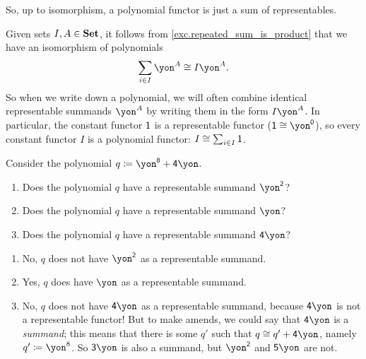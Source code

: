 \documentclass[Book-Poly]{subfiles}
\begin{document}
So, up to isomorphism, a polynomial functor is just a sum of representables.

\begin{remark}
    Given sets $I, A \in \mathbf{Set}$, it follows from \cref{exc.repeated_sum_is_product} that we have an isomorphism of polynomials
    \[
    \sum_{i \in I} \yon^A \iso I\yon^A.
    \]
    So when we write down a polynomial, we will often combine identical representable summands $\yon^A$ by writing them in the form $I\yon^A$.
    In particular, the constant functor $\textsf{1}$ is a representable functor ($\1 \iso \yon^\0$), so every constant functor $I$ is a polynomial functor: $I \cong \sum_{i \in I} \textsf{1}$.
\end{remark}

\begin{exercise}
    Consider the polynomial $q\coloneqq\yon^\8+\4\yon$.
    \begin{enumerate}
        \item Does the polynomial $q$ have a representable summand $\yon^\2$?
        \item Does the polynomial $q$ have a representable summand $\yon$?
        \item Does the polynomial $q$ have a representable summand $\4\yon$?
        \qedhere
    \end{enumerate}
    \begin{solution}
    \begin{enumerate}
        \item No, $q$ does not have $\yon^\2$ as a representable summand.
        \item Yes, $q$ does have $\yon$ as a representable summand.
        \item No, $q$ does not have $\4\yon$ as a representable summand, because $\4\yon$ is not a representable functor!
        But to make amends, we could say that $\4\yon$ is a \emph{summand}; this means that there is some $q'$ such that $q\iso q'+\4\yon$, namely $q'\coloneqq\yon^8$. So $\3\yon$ is also a summand, but $\yon^\2$ and $\5\yon$ are not.
    \end{enumerate}
    \end{solution}
\end{exercise}
\end{document}

